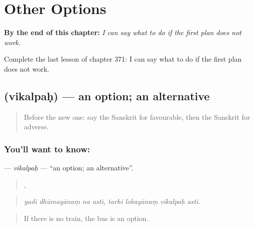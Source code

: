 
\chapter{Other Options}
\label{ch:sa-other-options}

\begin{chapteropening}
\textbf{By the end of this chapter:} \emph{I can say what to do if the first plan does not work.}

Complete the last lesson of chapter 371: I can say what to do if the first plan does not work.
\end{chapteropening}

\section[\texorpdfstring{\sk{विकल्पः} (vikalpaḥ)}{विकल्पः (vikalpaḥ)}]{ (vikalpaḥ) — an option; an alternative}

\label{lesson:SA-C371-vikalpah}



\begin{quote}
Before the new one: say the Sanskrit for favourable, then the Sanskrit for adverse.
\end{quote}

\subsection*{You'll want to know: }
\textbf{} — \emph{vikalpaḥ} — \textquotedblleft{}an option; an alternative\textquotedblright{}.

\begin{quote}
   ,    
\end{quote}

\begin{quote}
\emph{yadi dhūmayānaṃ na asti, tarhi lokayānaṃ vikalpaḥ asti.}
\end{quote}

\begin{quote}
If there is no train, the bus is an option.
\end{quote}

